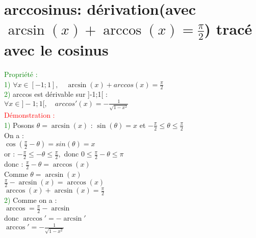 \documentclass{article}
\begin{document}
	\section{arccosinus: dérivation(avec $\arcsin(x) + \arccos(x) =\frac{\pi}{2}$) tracé avec le cosinus}
	\textcolor{green}{Propriété :} \\
	 \textcolor{green}{1)} $\forall x \in [-1 ; 1 ],\quad \arcsin(x) +arccos(x) = \frac{\pi}{2} $ \\
	 \textcolor{green}{2)} arccos est dérivable sur  ]-1;1[ : \\
	$\forall x \in ]-1;1[,\quad arccos'(x)=-\frac{1}{\sqrt{1-x^2}}$ \\
	\textcolor{red}{Démonstration :} \\
	\textcolor{green}{1)} Posons $ \theta = \arcsin(x)$ : $\sin(\theta)=x$ et $-\frac{\pi}{2}\leq \theta \leq \frac{\pi}{2}$ \\
	On a : \\
	$\cos(\frac{\pi}{2}-\theta)=sin(\theta)=x$ \\
	or : $ -\frac{\pi}{2} \leq - \theta \leq \frac{\pi}{2},$ donc $0 \leq \frac{\pi}{2}-\theta \leq \pi $ \\
	donc : $\frac{\pi}{2}- \theta = \arccos(x)$ \\
	Comme $\theta= \arcsin(x)$ \\
	$\frac{\pi}{2}-\arcsin(x)=\arccos(x)$ \\
	$\arccos(x) + \arcsin(x) =\frac{\pi}{2}$ \\
	\textcolor{green}{2)} Comme on a : \\
	$\arccos=\frac{\pi}{2}-\arcsin$ \\
	donc $\arccos'=-\arcsin'$ \\
	$\arccos' = - \frac{1}{\sqrt{1-x^2}}$ \\
\end{document}
